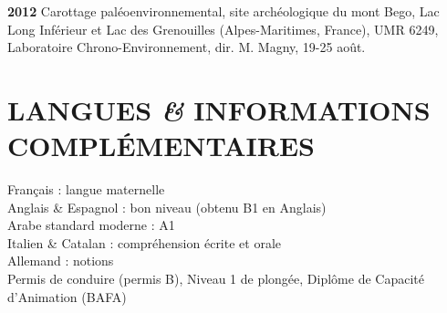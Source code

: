 \documentclass{article}
\newcommand{\fr}[1]{#1}       %
\newcommand{\en}[1]{}     %
\begin{document}
\smallbreak
\textbf{2012}
\fr{Carottage paléoenvironnemental, site archéologique du mont Bego, Lac Long Inférieur et Lac des Grenouilles (Alpes-Maritimes, France), UMR 6249, Laboratoire Chrono-Environnement, dir. M. Magny, 19-25 août.}
\en{Paleoenvironmental coring, archaeological site of Mont Bego, Lower Long Lake and Frog Lake (Alpes-Maritimes, France), UMR 6249, Laboratory of Chrono-Environment, directed by M. Magny, August 19-25.}

\section{\fr{LANGUES \textit{\&} INFORMATIONS COMPLÉMENTAIRES}\en{LANGUAGES \textit{\&} ADDITIONAL INFORMATION}}

\fr{Français : langue maternelle \\
Anglais \& Espagnol : bon niveau (obtenu B1 en Anglais) \\
Arabe standard moderne : A1 \\
Italien \& Catalan : compréhension écrite et orale \\
Allemand : notions \\

Permis de conduire (permis B), Niveau 1 de plongée, Diplôme de Capacité d'Animation (BAFA)}
\en{French: native speaker \\
English \& Spanish: proficient (achieved B1 in English) \\
Modern Standard Arabic: A1 \\
Italian \& Catalan: reading and listening comprehension \\
German: basic knowledge \\

Driver's license (Class B), Level 1 Diving Certificate, Certificate of Aptitude for Youth Leadership and Training (BAFA)}
\end{document}
